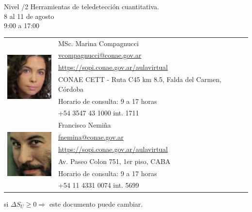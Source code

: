 \documentclass[11pt]{article}
\begin{document}
\begin{center}
    {\LARGE Nivel /2 Herramientas de teledetección cuantitativa.}\\
    {\large 8 al 11 de agosto}\\
    {\large 9:00 a 17:00}\\
\end{center}
\vspace{7mm}

\begin{center}
\begin{tabular}{ll}
  \multirow{6}{*}{\includegraphics[height=1in,width=1in]{pic_marina.png}} &
  \large MSc. Marina Compagnucci \\
  & \large \url{vcompagnucci@conae.gov.ar} \\
  & \large \url{https://sopi.conae.gov.ar/aulavirtual} \\
  & \large CONAE CETT - Ruta C45 km 8.5, Falda del Carmen, C\'ordoba\\
  & \large Horario de consulta: 9 a 17 horas\\
  & \large +54 3547 43 1000 int. 1711 \\

  \multirow{6}{*}{\includegraphics[height=1in,width=1in]{pic_fran.png}} &
    \large Francisco Nemiña \\
  & \large \url{fnemina@conae.gov.ar} \\
  & \large \url{https://sopi.conae.gov.ar/aulavirtual} \\
  & \large Av. Paseo Colon 751, 1er piso, CABA\\
  & \large Horario de consulta: 9 a 17 horas\\
  & \large +54 11 4331 0074 int. 5699 \\
\end{tabular}

\end{center}
\vspace{5mm}
\begin{center} si $\Delta S_U \ge 0 \Rightarrow$ este documento puede cambiar. \\
\end{center}
\end{document}
